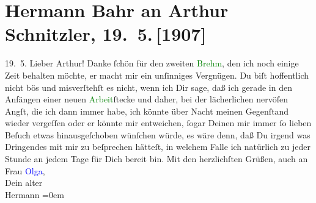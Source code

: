 

               \section[Hermann Bahr an Arthur Schnitzler, 19. 5. {[}1907{]}]{ Hermann Bahr an Arthur Schnitzler, 19. 5. {[}1907{]}}\nopagebreak{}\rehead{ }\normalsize\beginnumbering{} \toendnotes[C]{\smallbreak\pagebreak[2]} 
\toendnotes[C]{\smallbreak}\pstart
           \raggedleft{}{\pb}19. 5.\pend
           \pstart{}Lieber Arthur!\pend\pstart
           Danke ſchön für den zweiten \textcolor{green}{Brehm}{}\ledrightnote{\textcolor{green}{Brehms Tierleben}}, den ich noch
               einige Zeit behalten möchte, er macht mir ein unſinniges Vergnügen.\pend
           \pstart
           Du biſt hoffentlich nicht bös und misverſtehſt es nicht, wenn ich Dir sage, daß ich
               gerade in den Anfängen einer neuen \textcolor{green}{Arbeit}{}ſtecke und daher, bei der lächerlichen nervöſen Angſt, die ich dann
               immer habe, ich könnte über Nacht meinen Gegenſtand wieder vergeſſen oder er könnte
               mir entweichen, ſogar Deinen mir immer ſo lieben Beſuch etwas hinausgeſchoben {\pb}wünſchen würde, es wäre denn, daß Du irgend was
               Dringendes mit mir zu beſprechen hätteſt, in welchem Falle ich natürlich zu jeder
               Stunde an jedem Tage für Dich bereit bin.\pend
           \pstart
           Mit den herzlichſten Grüßen, auch an Frau \textcolor{blue}{Olga}{}\ledrightnote{\textcolor{blue}{Olga Schnitzler}},{\\[\baselineskip]}Dein alter{\\[\baselineskip]}\spacefill\mbox{Hermann}\pend
           \leftskip=0em{}\endnumbering{}  
      